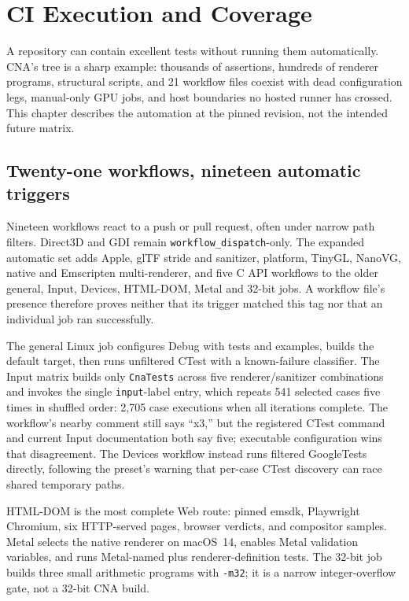 \chapter{CI Execution and Coverage}
\label{ch:ci-reality}

A repository can contain excellent tests without running them automatically.  CNA's tree is a
sharp example: thousands of assertions, hundreds of renderer programs, structural scripts,
and 21 workflow files coexist with dead configuration legs, manual-only GPU jobs, and host
boundaries no hosted runner has crossed.  This chapter describes the automation at the pinned
revision, not the intended future matrix.

\section{Twenty-one workflows, nineteen automatic triggers}

Nineteen workflows react to a push or pull request, often under narrow path filters.  Direct3D
and GDI remain \texttt{workflow\_dispatch}-only.  The expanded automatic set adds Apple,
glTF stride and sanitizer, platform, TinyGL, NanoVG, native and Emscripten multi-renderer, and
five C API workflows to the older general, Input, Devices, HTML-DOM, Metal and 32-bit jobs.  A
workflow file's presence therefore proves neither that its trigger matched this tag nor that an
individual job ran successfully.

The general Linux job configures Debug with tests and examples, builds the default target, then
runs unfiltered CTest with a known-failure classifier.  The Input matrix builds only
\texttt{CnaTests} across five renderer/sanitizer combinations and invokes the single
\texttt{input}-label entry, which repeats 541 selected cases five times in shuffled order: 2,705
case executions when all iterations complete.  The workflow's nearby comment still says
``x3,'' but the registered CTest command and current Input documentation both say five; executable
configuration wins that disagreement.  The Devices workflow instead runs filtered GoogleTests
directly, following the preset's warning that per-case CTest discovery can race shared temporary
paths.

HTML-DOM is the most complete Web route: pinned emsdk, Playwright Chromium, six HTTP-served pages,
browser verdicts, and compositor samples.  Metal selects the native renderer on macOS~14, enables
Metal validation variables, and runs Metal-named plus renderer-definition tests.  The 32-bit job
builds three small arithmetic programs with \texttt{-m32}; it is a narrow integer-overflow gate,
not a 32-bit CNA build.

